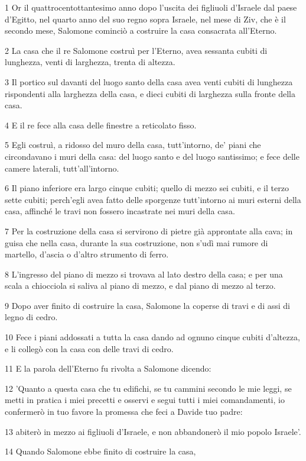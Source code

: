 \par 1 Or il quattrocentottantesimo anno dopo l'uscita dei figliuoli d'Israele dal paese d'Egitto, nel quarto anno del suo regno sopra Israele, nel mese di Ziv, che è il secondo mese, Salomone cominciò a costruire la casa consacrata all'Eterno.
\par 2 La casa che il re Salomone costruì per l'Eterno, avea sessanta cubiti di lunghezza, venti di larghezza, trenta di altezza.
\par 3 Il portico sul davanti del luogo santo della casa avea venti cubiti di lunghezza rispondenti alla larghezza della casa, e dieci cubiti di larghezza sulla fronte della casa.
\par 4 E il re fece alla casa delle finestre a reticolato fisso.
\par 5 Egli costruì, a ridosso del muro della casa, tutt'intorno, de' piani che circondavano i muri della casa: del luogo santo e del luogo santissimo; e fece delle camere laterali, tutt'all'intorno.
\par 6 Il piano inferiore era largo cinque cubiti; quello di mezzo sei cubiti, e il terzo sette cubiti; perch'egli avea fatto delle sporgenze tutt'intorno ai muri esterni della casa, affinché le travi non fossero incastrate nei muri della casa.
\par 7 Per la costruzione della casa si servirono di pietre già approntate alla cava; in guisa che nella casa, durante la sua costruzione, non s'udì mai rumore di martello, d'ascia o d'altro strumento di ferro.
\par 8 L'ingresso del piano di mezzo si trovava al lato destro della casa; e per una scala a chiocciola si saliva al piano di mezzo, e dal piano di mezzo al terzo.
\par 9 Dopo aver finito di costruire la casa, Salomone la coperse di travi e di assi di legno di cedro.
\par 10 Fece i piani addossati a tutta la casa dando ad ognuno cinque cubiti d'altezza, e li collegò con la casa con delle travi di cedro.
\par 11 E la parola dell'Eterno fu rivolta a Salomone dicendo:
\par 12 'Quanto a questa casa che tu edifichi, se tu cammini secondo le mie leggi, se metti in pratica i miei precetti e osservi e segui tutti i miei comandamenti, io confermerò in tuo favore la promessa che feci a Davide tuo padre:
\par 13 abiterò in mezzo ai figliuoli d'Israele, e non abbandonerò il mio popolo Israele'.
\par 14 Quando Salomone ebbe finito di costruire la casa,
